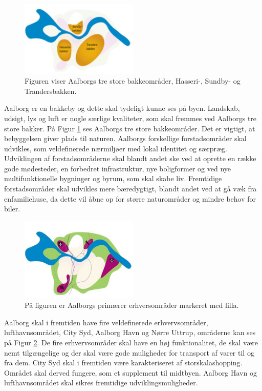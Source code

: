 \begin{figure}[H] 
\centering
\includegraphics[width=0.50\textwidth]{billeder/Bykvalitet1}
\caption{Figuren viser Aalborgs tre store bakkeområder, Hasseri-, Sundby- og Trandersbakken.}
\label{fig:Bykvalitet1}
\end{figure}

Aalborg er en bakkeby og dette skal tydeligt kunne ses på byen. Landskab, udsigt, lys og luft er nogle særlige kvaliteter, som skal fremmes ved Aalborgs tre store bakker. På Figur \ref{fig:Bykvalitet1} ses Aalborgs tre store bakkeområder. Det er vigtigt, at bebyggelsen giver plads til naturen. Aalborgs forskellige forstadsområder skal udvikles, som veldefinerede nærmiljøer med lokal identitet og særpræg. Udviklingen af forstadsområderne skal blandt andet ske ved at oprette en række gode mødesteder, en forbedret infrastruktur, nye boligformer og ved nye multifunktionelle bygninger og byrum, som skal skabe liv. Fremtidige forstadsområder skal udvikles mere bæredygtigt, blandt andet ved at gå væk fra enfamiliehuse, da dette vil åbne op for større naturområder og mindre behov for biler.

\begin{figure}[H] 
\centering
\includegraphics[width=0.50\textwidth]{billeder/Bykvalitet2}
\caption{På figuren er Aalborgs primærer erhversområder markeret med lilla.}
\label{fig:Bykvalitet2}
\end{figure}

Aalborg skal i fremtiden have fire veldefinerede erhvervsområder, lufthavnsområdet, City Syd, Aalborg Havn og Nørre Uttrup, områderne kan ses på Figur \ref{fig:Bykvalitet2}. De fire erhvervsområder skal have en høj funktionalitet, de skal være nemt tilgængelige og der skal være gode muligheder for transport af varer til og fra dem. City Syd skal i fremtiden være karakteriseret af storskalashopping. Området skal derved fungere, som et supplement til midtbyen. Aalborg Havn og lufthavnsområdet skal sikres fremtidige udviklingsmuligheder. 

